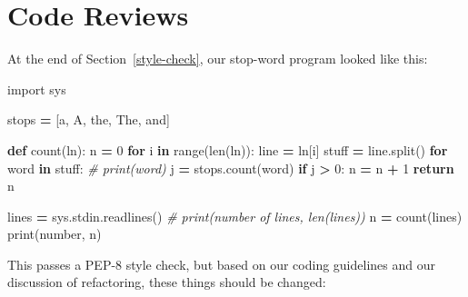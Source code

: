 \documentclass[
]{krantz}
\makeatletter
\newenvironment{Shaded}{\begin{snugshade}}{\end{snugshade}}
\newcommand{\BuiltInTok}[1]{#1}
\newcommand{\CommentTok}[1]{\textcolor[rgb]{0.56,0.35,0.01}{\textit{#1}}}
\newcommand{\ControlFlowTok}[1]{\textcolor[rgb]{0.13,0.29,0.53}{\textbf{#1}}}
\newcommand{\DecValTok}[1]{\textcolor[rgb]{0.00,0.00,0.81}{#1}}
\newcommand{\ImportTok}[1]{#1}
\newcommand{\KeywordTok}[1]{\textcolor[rgb]{0.13,0.29,0.53}{\textbf{#1}}}
\newcommand{\NormalTok}[1]{#1}
\newcommand{\OperatorTok}[1]{\textcolor[rgb]{0.81,0.36,0.00}{\textbf{#1}}}
\newcommand{\StringTok}[1]{\textcolor[rgb]{0.31,0.60,0.02}{#1}}
\newenvironment{kframe}{%
\medskip{}
\setlength{\fboxsep}{.8em}
 \def\at@end@of@kframe{}%
 \ifinner\ifhmode%
  \def\at@end@of@kframe{\end{minipage}}%
  \begin{minipage}{\columnwidth}%
 \fi\fi%
 \def\FrameCommand##1{\hskip\@totalleftmargin \hskip-\fboxsep
 \colorbox{shadecolor}{##1}\hskip-\fboxsep
     \hskip-\linewidth \hskip-\@totalleftmargin \hskip\columnwidth}%
 \MakeFramed {\advance\hsize-\width
   \@totalleftmargin\z@ \linewidth\hsize
   \@setminipage}}%
 {\par\unskip\endMakeFramed%
 \at@end@of@kframe}
\renewenvironment{Shaded}{\begin{kframe}}{\end{kframe}}
\makeatother
\begin{document}
\hypertarget{style-review}{%
\section{Code Reviews}\label{style-review}}

At the end of Section~\ref{style-check},
our stop-word program looked like this:

\begin{Shaded}
\begin{Highlighting}[]
\ImportTok{import}\NormalTok{ sys}


\NormalTok{stops }\OperatorTok{=}\NormalTok{ [}\StringTok{\textquotesingle{}a\textquotesingle{}}\NormalTok{, }\StringTok{\textquotesingle{}A\textquotesingle{}}\NormalTok{, }\StringTok{\textquotesingle{}the\textquotesingle{}}\NormalTok{, }\StringTok{\textquotesingle{}The\textquotesingle{}}\NormalTok{, }\StringTok{\textquotesingle{}and\textquotesingle{}}\NormalTok{]}


\KeywordTok{def}\NormalTok{ count(ln):}
\NormalTok{    n }\OperatorTok{=} \DecValTok{0}
    \ControlFlowTok{for}\NormalTok{ i }\KeywordTok{in} \BuiltInTok{range}\NormalTok{(}\BuiltInTok{len}\NormalTok{(ln)):}
\NormalTok{        line }\OperatorTok{=}\NormalTok{ ln[i]}
\NormalTok{        stuff }\OperatorTok{=}\NormalTok{ line.split()}
        \ControlFlowTok{for}\NormalTok{ word }\KeywordTok{in}\NormalTok{ stuff:}
            \CommentTok{\# print(word)}
\NormalTok{            j }\OperatorTok{=}\NormalTok{ stops.count(word)}
            \ControlFlowTok{if}\NormalTok{ j }\OperatorTok{\textgreater{}} \DecValTok{0}\NormalTok{:}
\NormalTok{                n }\OperatorTok{=}\NormalTok{ n }\OperatorTok{+} \DecValTok{1}
    \ControlFlowTok{return}\NormalTok{ n}


\NormalTok{lines }\OperatorTok{=}\NormalTok{ sys.stdin.readlines()}
\CommentTok{\# print(\textquotesingle{}number of lines\textquotesingle{}, len(lines))}
\NormalTok{n }\OperatorTok{=}\NormalTok{ count(lines)}
\BuiltInTok{print}\NormalTok{(}\StringTok{\textquotesingle{}number\textquotesingle{}}\NormalTok{, n)}
\end{Highlighting}
\end{Shaded}

This passes a PEP-8 style check,
but based on our coding guidelines and our discussion of refactoring,
these things should be changed:
\end{document}

